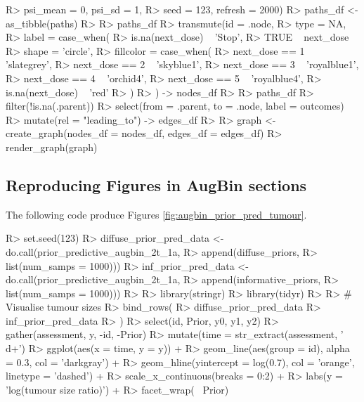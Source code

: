 \documentclass[article]{jss}
\begin{document}
\begin{CodeChunk}
\begin{CodeInput}
R>                      psi_mean = 0, psi_sd = 1, 
R>                      seed = 123, refresh = 2000)
R> paths_df <- as_tibble(paths)
R> 
R> paths_df %
R>   transmute(id = .node,
R>             type = NA,
R>             label = case_when(
R>               is.na(next_dose) ~ 'Stop',
R>               TRUE ~ next_dose %
R>             shape = 'circle',
R>             fillcolor = case_when(
R>               next_dose == 1 ~ 'slategrey',
R>               next_dose == 2 ~ 'skyblue1',
R>               next_dose == 3 ~ 'royalblue1',
R>               next_dose == 4 ~ 'orchid4',
R>               next_dose == 5 ~ 'royalblue4',
R>               is.na(next_dose) ~ 'red'
R>             )
R>   ) -> nodes_df
R> 
R> paths_df %
R>   filter(!is.na(.parent)) %
R>   select(from = .parent, to = .node, label = outcomes) %
R>   mutate(rel = "leading_to") -> edges_df
R> 
R> graph <- create_graph(nodes_df = nodes_df, edges_df = edges_df)
R> render_graph(graph)
\end{CodeInput}
\end{CodeChunk}

\hypertarget{reproducing-figures-in-augbin-sections}{%
\subsection{Reproducing Figures in AugBin
sections}\label{reproducing-figures-in-augbin-sections}}

The following code produce Figures \ref{fig:augbin_prior_pred_tumour}.

\begin{CodeChunk}

\begin{CodeInput}
R> set.seed(123)
R> diffuse_prior_pred_data <- do.call(prior_predictive_augbin_2t_1a, 
R>                                    append(diffuse_priors, 
R>                                           list(num_samps = 1000)))
R> inf_prior_pred_data <- do.call(prior_predictive_augbin_2t_1a, 
R>                                append(informative_priors, 
R>                                       list(num_samps = 1000)))
R> 
R> library(stringr)
R> library(tidyr)
R> 
R> # Visualise tumour sizes
R> bind_rows(
R>   diffuse_prior_pred_data %
R>   inf_prior_pred_data %
R> ) %
R>   select(id, Prior, y0, y1, y2) %
R>   gather(assessment, y, -id, -Prior) %
R>   mutate(time = str_extract(assessment, '\\d+') %
R>   ggplot(aes(x = time, y = y)) + 
R>   geom_line(aes(group = id), alpha = 0.3, col = 'darkgray') + 
R>   geom_hline(yintercept = log(0.7), col = 'orange', linetype = 'dashed') + 
R>   scale_x_continuous(breaks = 0:2) + 
R>   labs(y = 'log(tumour size ratio)') + 
R>   facet_wrap(~ Prior)
\end{CodeInput}
\end{CodeChunk}
\end{document}
